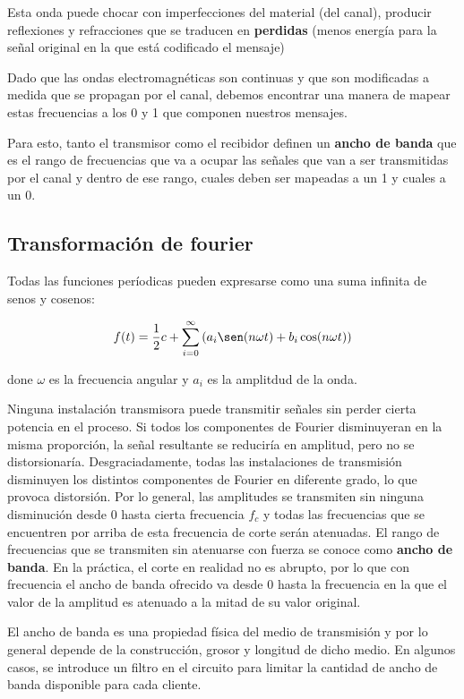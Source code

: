 Esta onda puede chocar con imperfecciones del material (del canal), producir reflexiones y refracciones que se traducen en \textbf{perdidas} (menos energía para la señal original en la que está codificado el mensaje)

Dado que las ondas electromagnéticas son continuas y que son modificadas a medida que se propagan por el canal, debemos encontrar una manera de mapear estas frecuencias a los 0 y 1 que componen nuestros mensajes.

Para esto, tanto el transmisor como el recibidor definen un \textbf{ancho de banda} que es el rango de frecuencias que va a ocupar las señales que van a ser transmitidas por el canal y dentro de ese rango, cuales deben ser mapeadas a un 1 y cuales a un 0.

\subsection{Transformación de fourier}
Todas las funciones períodicas pueden expresarse como una suma infinita de senos y cosenos:

\[f(t) = \frac{1}{2}c + \sum_{i=0}^\infty \left(a_i\sen(n\omega t) + b_i\cos(n\omega t)\right)\]

done \(\omega\) es la frecuencia angular y \(a_i\) es la amplitdud de la onda.

Ninguna instalación transmisora puede transmitir señales sin perder cierta potencia en el proceso. Si todos los componentes de Fourier disminuyeran en la misma proporción, la señal resultante se reduciría en amplitud, pero no se distorsionaría. Desgraciadamente, todas las instalaciones de transmisión disminuyen los distintos componentes de Fourier en diferente grado, lo que provoca distorsión. Por lo general, las amplitudes se transmiten sin ninguna disminución desde 0 hasta cierta frecuencia \(f_c\) y todas las frecuencias que se encuentren por arriba de esta frecuencia de corte serán atenuadas. El rango de frecuencias que se transmiten sin atenuarse con fuerza se conoce como \textbf{ancho de banda}. En la práctica, el corte en realidad no es abrupto, por lo que con frecuencia el ancho de banda ofrecido va desde 0 hasta la frecuencia en la que el valor de la amplitud es atenuado a la mitad de su valor original.

El ancho de banda es una propiedad física del medio de transmisión y por lo general depende
de la construcción, grosor y longitud de dicho medio. En algunos casos, se introduce un filtro en el
circuito para limitar la cantidad de ancho de banda disponible para cada cliente.


